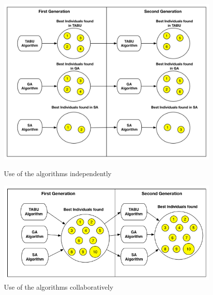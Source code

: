 \documentclass{bmcart}
\begin{document}
\begin{backmatter}
\begin{figure}[h]
\begin{minipage}{.5\textwidth}
\centering
\includegraphics{./images/independ.png}
\caption{Use of the algorithms independently \citep{Gois2016}}
\label{fig:firstaproach}
\end{minipage}
\begin{minipage}{.5\textwidth}
\centering
\includegraphics{./images/collaborative.png}
\caption{Use of the  algorithms collaboratively \citep{Gois2016}}
\label{fig:secondapproach}
\end{minipage}
\end{figure}


\end{backmatter}
\end{document}
